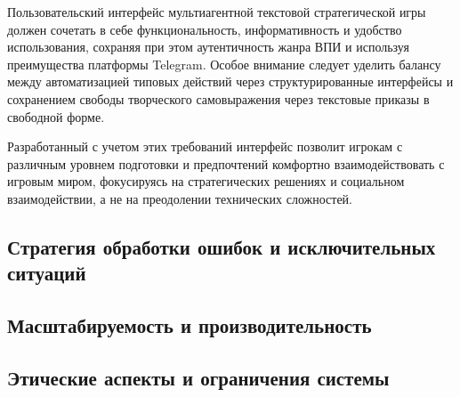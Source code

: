 Пользовательский интерфейс мультиагентной текстовой стратегической игры должен сочетать в себе функциональность, информативность и удобство использования, сохраняя при этом аутентичность жанра ВПИ и используя преимущества платформы Telegram. Особое внимание следует уделить балансу между автоматизацией типовых действий через структурированные интерфейсы и сохранением свободы творческого самовыражения через текстовые приказы в свободной форме.

Разработанный с учетом этих требований интерфейс позволит игрокам с различным уровнем подготовки и предпочтений комфортно взаимодействовать с игровым миром, фокусируясь на стратегических решениях и социальном взаимодействии, а не на преодолении технических сложностей.

\subsection{Стратегия обработки ошибок и исключительных ситуаций}

\subsection{Масштабируемость и производительность}

\subsection{Этические аспекты и ограничения системы}